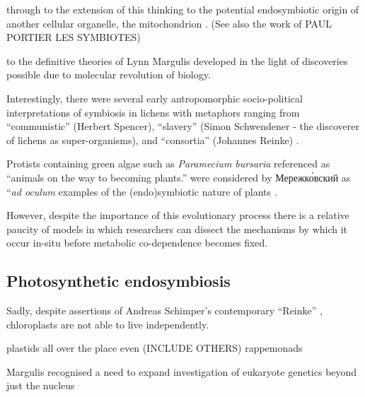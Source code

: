 through to the extension of this
thinking to the potential endosymbiotic origin of another cellular organelle, 
the mitochondrion \citep{Wallin1922}. (See also the work of PAUL PORTIER LES SYMBIOTES)


 
to the definitive theories of Lynn Margulis \citep{Sagan1967} developed in the light
of discoveries possible due to molecular revolution of biology.




Interestingly, there were several early antropomorphic socio-political 
interpretations of symbiosis in lichens with metaphors ranging from ``communistic'' 
(Herbert Spencer), ``slavery'' (Simon Schwendener - the discoverer of lichens as
super-organisms), and ``consortia'' (Johannes Reinke) \citep{Sapp2002}.




Protists containing green algae such as \textit{Paramecium bursaria} referenced
as ``animals on the way to becoming plants.'' were considered by Мережко́вский 
as ``\textit{ad oculum} examples of the (endo)symbiotic nature of plants \citep{Mereschkowsky1920,Sapp2002}. 



However, despite the importance of this evolutionary process there is a relative
paucity of models in which researchers can dissect the mechanisms by which it occur
in-situ before metabolic co-dependence becomes fixed.

\subsection{Photosynthetic endosymbiosis}




Sadly, despite assertions of Andreas Schimper's contemporary ``Reinke'' 
\citep{Schimper1883}, chloroplasts are not able to live independently.







plastids all over the place even (INCLUDE OTHERS) rappemonads \citep{Kim2011a}


Margulis recognised a need to expand investigation of eukaryote genetics beyond 
just the nucleus \citep{Archibald2012}


